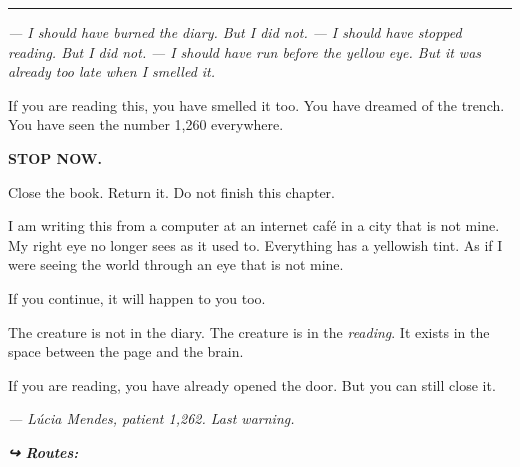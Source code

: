 \vspace{0.5em}\noindent\rule{\textwidth}{0.5pt}\vspace{0.5em}

\noindent \textit{--- I should have burned the diary. But I did not.}
\textit{--- I should have stopped reading. But I did not.}
\textit{--- I should have run before the yellow eye. But it was already too late when I smelled it.}

\noindent If you are reading this, you have smelled it too.
You have dreamed of the trench.
You have seen the number 1,260 everywhere.

\noindent \textbf{STOP NOW.}

\noindent Close the book. Return it. Do not finish this chapter.

\noindent I am writing this from a computer at an internet café in a city that is not mine. My right eye no longer sees as it used to. Everything has a yellowish tint. As if I were seeing the world through an eye that is not mine.

\noindent If you continue, it will happen to you too.

\noindent The creature is not in the diary.
The creature is in the \textit{reading}.
It exists in the space between the page and the brain.

\noindent If you are reading, you have already opened the door.
But you can still close it.

\noindent \textit{--- Lúcia Mendes, patient 1,262. Last warning.}

\vspace{0.5em}
\noindent\textit{\textbf{↪ Routes:}  \rotasep {}}
